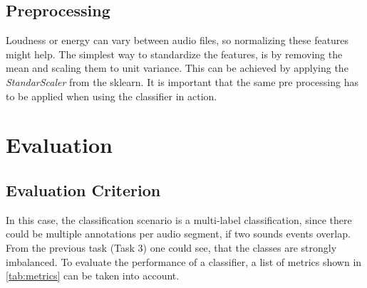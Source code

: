 \documentclass{article}
\begin{document}
\subsection{Preprocessing}

Loudness or energy can vary between audio files, so normalizing these features might help. The simplest way to standardize the features, is by removing the mean and scaling them to unit variance. This can be achieved by applying the \emph{StandarScaler} from the sklearn. It is important that the same pre processing has to be applied when using the classifier in action.


\section{Evaluation}

\subsection{Evaluation Criterion}

In this case, the classification scenario is a multi-label classification, since there could be multiple annotations per audio segment, if two sounds events overlap. From the previous task (Task 3) one could see, that the classes are strongly imbalanced. To evaluate the performance of a classifier, a list of metrics shown in \autoref{tab:metrics} can be taken into account.
\end{document}
